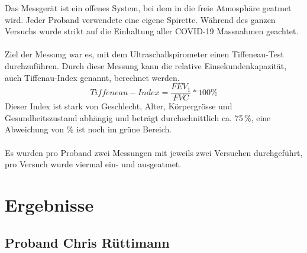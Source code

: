 \documentclass[11pt]{scrartcl}
\begin{document}
    Das Messgerät ist ein offenes System, bei dem in die freie Atmosphäre geatmet wird.
    Jeder Proband verwendete eine eigene Spirette.
    Während des ganzen Versuchs wurde strikt auf die Einhaltung aller COVID-19 Massnahmen geachtet.\\\\
    Ziel der Messung war es, mit dem Ultraschallspirometer einen Tiffeneau-Test durchzuführen.
    Durch diese Messung kann die relative Einsekundenkapazität, auch Tiffenau-Index genannt, berechnet werden.
    \begin{equation}
        Tiffeneau-Index = \frac{FEV_{1}}{FVC} * 100\%
    \end{equation}
    Dieser Index ist stark von Geschlecht, Alter, Körpergrösse und Gesundheitszustand abhängig und beträgt
    durchschnittlich ca.
    75\,\%, eine Abweichung von \% ist noch im grüne Bereich.\\\\
    Es wurden pro Proband zwei Messungen mit jeweils zwei Versuchen durchgeführt, pro Versuch wurde viermal ein- und
    ausgeatmet.

    \section{Ergebnisse}
    \subsection{Proband Chris Rüttimann}
\end{document}
